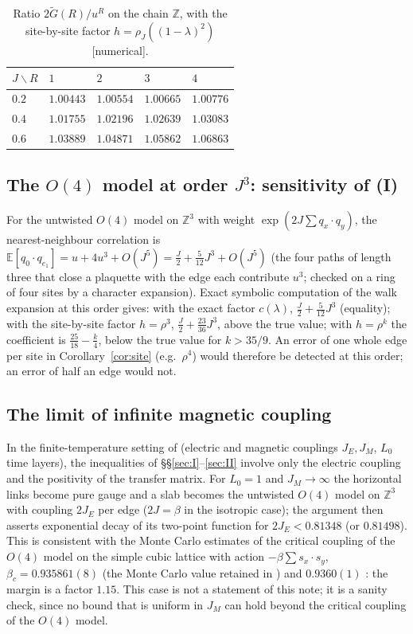 \documentclass[11pt,a4paper]{article}
\theoremstyle{plain}
\theoremstyle{remark}
\numberwithin{equation}{section}
\newcommand{\Z}{\mathbb{Z}}
\newcommand{\E}{\mathbb{E}}
\newcommand{\Gt}{\widetilde G}
\newcommand{\st}[1]{\textsf{[#1]}}
\begin{document}
\begin{table}[ht]
\centering\small
\begin{tabular}{@{}lllll@{}}
\toprule
$J\backslash R$ & $1$ & $2$ & $3$ & $4$\\
\midrule
$0.2$ & $1.00443$ & $1.00554$ & $1.00665$ & $1.00776$\\
$0.4$ & $1.01755$ & $1.02196$ & $1.02639$ & $1.03083$\\
$0.6$ & $1.03889$ & $1.04871$ & $1.05862$ & $1.06863$\\
\bottomrule
\end{tabular}
\caption{Ratio $2\Gt(R)/u^R$ on the chain $\Z$, with the site-by-site factor $h=\rho_J((1-\lambda)^2)$ \st{numerical}.}
\label{tab:2d}
\end{table}

\subsection{The \texorpdfstring{$O(4)$}{O(4)} model at order \texorpdfstring{$J^3$}{J\^{}3}: sensitivity of (I)}
For the untwisted $O(4)$ model on $\Z^3$ with weight $\exp(2J\sum q_x\cdot q_y)$, the nearest-neighbour correlation is
$\E[q_0\cdot q_{e_1}]=u+4u^3+O(J^5)=\frac J2+\frac5{12}J^3+O(J^5)$ (the four paths of length three that close a plaquette with the
edge each contribute $u^3$; checked on a ring of four sites by a character expansion). Exact symbolic computation of the walk
expansion at this order gives: with the exact factor $c(\lambda)$, $\frac J2+\frac5{12}J^3$ (equality); with the site-by-site factor
$h=\rho^3$, $\frac J2+\frac{23}{36}J^3$, above the true value; with $h=\rho^k$ the coefficient is $\frac{25}{18}-\frac k4$, below the
true value for $k>35/9$. An error of one whole edge per site in Corollary~\ref{cor:site} (e.g.\ $\rho^4$) would therefore be detected
at this order; an error of half an edge would not.

\subsection{The limit of infinite magnetic coupling}\label{sec:O4}
In the finite-temperature setting of \cite{BS83} (electric and magnetic couplings $J_E,J_M$, $L_0$ time layers), the inequalities of
\S\S\ref{sec:I}--\ref{sec:II} involve only the electric coupling and the positivity of the transfer matrix. For $L_0=1$ and
$J_M\to\infty$ the horizontal links become pure gauge and a slab becomes the untwisted $O(4)$ model on $\Z^3$ with coupling
$2J_E$ per edge ($2J=\beta$ in the isotropic case); the argument then asserts exponential decay of its two-point function for
$2J_E<0.81348$ (or $0.81498$). This is consistent with the Monte Carlo estimates of the critical coupling of the $O(4)$ model on the
simple cubic lattice with action $-\beta\sum s_x\cdot s_y$, $\beta_c=0.935861(8)$ (the Monte Carlo value retained in
\cite[Tables~3--4]{CH98}) and $0.9360(1)$ \cite{KK95}: the margin is a factor $1.15$. This case is not a statement of this note; it is a sanity check,
since no bound that is uniform in $J_M$ can hold beyond the critical coupling of the $O(4)$ model.
\end{document}

